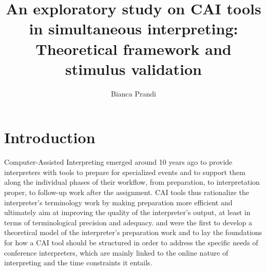 \documentclass[output=paper]{langsci/langscibook}
\author{Bianca Prandi\affiliation{Affiliation}}
\title{An exploratory study on CAI tools in simultaneous interpreting: Theoretical framework and stimulus validation}
\begin{document}

 

 

 

 

 

 

 

\section{Introduction}\label{sec:prandi:1}
Computer-Assisted Interpreting emerged around 10 years ago to provide interpreters with tools to prepare for specialized events and to support them along the individual phases of their workflow, from preparation, to interpretation proper, to follow-up work after the assignment. \textsc{CAI} tools thus rationalize the interpreter’s terminology work by making preparation more efficient and ultimately aim at improving the quality of the interpreter’s output, at least in terms of terminological precision and adequacy. \citet{Rütten2007} and \citet{Will2009} were the first to develop a theoretical model of the interpreter’s preparation work and to lay the foundations for how a \textsc{CAI} tool should be structured in order to address the specific needs of conference interpreters, which are mainly linked to the online nature of interpreting and the time constraints it entails.
\end{document}
